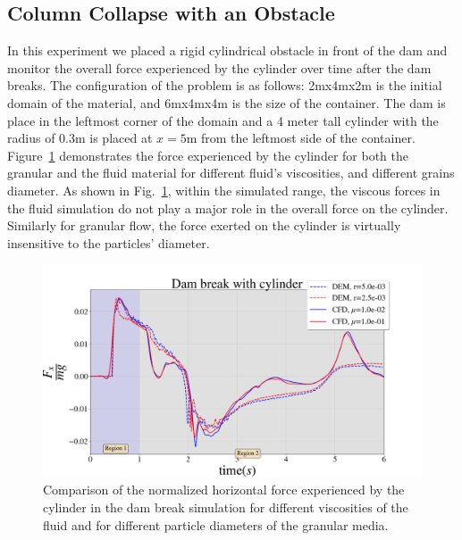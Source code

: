 \subsection{Column Collapse with an Obstacle}
In this experiment we placed a rigid cylindrical obstacle in front of the dam and monitor the overall force experienced by the cylinder over time after the dam breaks. The configuration of the problem is as follows: 2\si{m}x4\si{m}x2\si{m} is the initial domain of the material, and 6\si{m}x4\si{m}x4\si{m} is the size of the container. The dam is place in the leftmost corner of the domain and a 4 meter tall cylinder with the radius of 0.3\si{m} is placed at $x=5$\si{m} from the leftmost side of the container. Figure~\ref{fig:db_obstacle} demonstrates the force experienced by the cylinder for both the granular and the fluid material for different fluid's viscosities, and different grains diameter. As shown in Fig.~\ref{fig:db_obstacle}, within the simulated range, the viscous forces in the fluid simulation do not play a major role in the overall force on the cylinder. Similarly for granular flow, the force exerted on the cylinder is virtually insensitive to the particles' diameter. 

\begin{figure}[H]
	\begin{center}
		\includegraphics[width=.8\textwidth]{images/CFD_DEM/Figure_Dambreak_obstacle.png}
	\end{center}
	\caption{Comparison of the normalized horizontal force experienced by the cylinder in the dam break simulation for different viscosities of the fluid and for different particle diameters of the granular media.}
	\label{fig:db_obstacle}
\end{figure}

